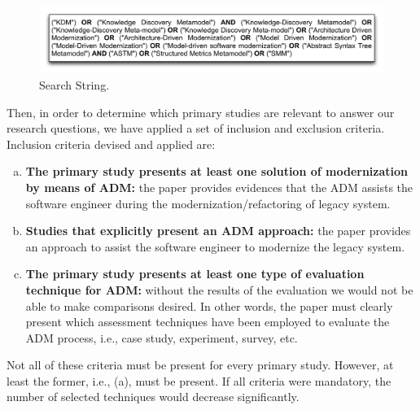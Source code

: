\begin{figure}[!h]
\centering
  \includegraphics[scale=0.35]{figuras/SearchStringADM}
\caption{Search String.}
\label{search_string}
\end{figure} 

Then, in order to determine which primary studies are relevant to answer our research questions, we have applied a set of inclusion and exclusion criteria. Inclusion criteria devised and applied are:

\begin{enumerate}[(a)]%
\item \textbf{The primary study presents at least one solution of modernization by means of ADM:} the paper provides evidences that the ADM assists the software engineer during the modernization/refactoring of legacy system.

\item \textbf{Studies that explicitly present an ADM approach:} the paper provides an approach to assist the software engineer to modernize the legacy system.

\item \textbf{The primary study presents at least one type of evaluation technique for ADM:} without the results of the evaluation we would not be able to make comparisons desired. In other words, the paper must clearly present which assessment techniques have been employed to evaluate the ADM process, i.e., case study, experiment, survey, etc.
\end{enumerate}

Not all of these criteria must be present for every primary study. However, at least the former, i.e., (a), must be present. If all criteria were mandatory, the number of selected techniques would decrease significantly.

